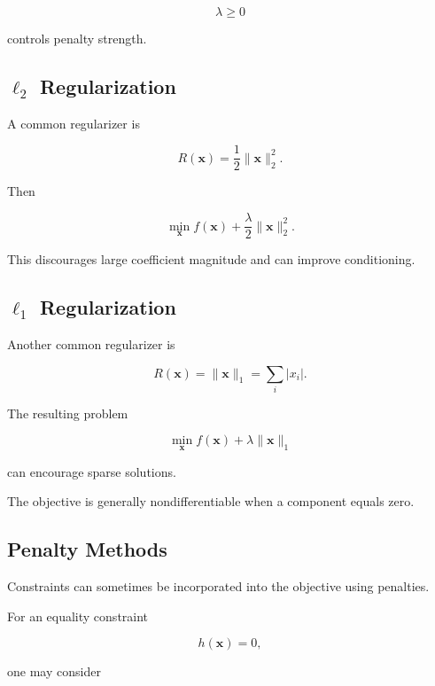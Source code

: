 \[
\lambda\geq0
\]

controls penalty strength.

\subsection{\(\ell_2\) Regularization}
\label{subsec:l2-regularization}

A common regularizer is

\[
\boxed{
R(\mathbf{x})
=
\frac12
\|\mathbf{x}\|_2^2.
}
\]

Then

\[
\boxed{
\min_{\mathbf{x}}
f(\mathbf{x})
+
\frac{\lambda}{2}
\|\mathbf{x}\|_2^2.
}
\]

This discourages large coefficient magnitude and can improve conditioning.

\subsection{\(\ell_1\) Regularization}
\label{subsec:l1-regularization}

Another common regularizer is

\[
\boxed{
R(\mathbf{x})
=
\|\mathbf{x}\|_1
=
\sum_i|x_i|.
}
\]

The resulting problem

\[
\boxed{
\min_{\mathbf{x}}
f(\mathbf{x})
+
\lambda
\|\mathbf{x}\|_1
}
\]

can encourage sparse solutions.

The objective is generally nondifferentiable when a component equals
zero.

\subsection{Penalty Methods}
\label{subsec:penalty-methods-preview}

Constraints can sometimes be incorporated into the objective using
penalties.

For an equality constraint

\[
h(\mathbf{x})=0,
\]

one may consider

